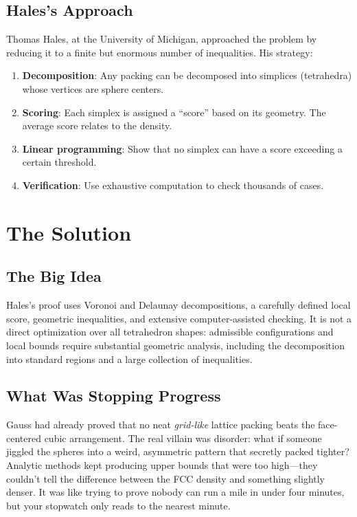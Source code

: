 \subsection{Hales's Approach}

Thomas Hales, at the University of Michigan, approached the problem by reducing it to a finite but enormous number of inequalities. His strategy:

\begin{enumerate}
\item \textbf{Decomposition}: Any packing can be decomposed into simplices (tetrahedra) whose vertices are sphere centers.
\item \textbf{Scoring}: Each simplex is assigned a ``score'' based on its geometry. The average score relates to the density.
\item \textbf{Linear programming}: Show that no simplex can have a score exceeding a certain threshold.
\item \textbf{Verification}: Use exhaustive computation to check thousands of cases.
\end{enumerate}

\section{The Solution}

\subsection{The Big Idea}
Hales's proof uses Voronoi and Delaunay decompositions, a carefully defined local score, geometric inequalities, and extensive computer-assisted checking. It is not a direct optimization over all tetrahedron shapes: admissible configurations and local bounds require substantial geometric analysis, including the decomposition into standard regions and a large collection of inequalities.

\subsection{What Was Stopping Progress}
Gauss had already proved that no neat \emph{grid-like} lattice packing beats the face-centered cubic arrangement. The real villain was disorder: what if someone jiggled the spheres into a weird, asymmetric pattern that secretly packed tighter? Analytic methods kept producing upper bounds that were too high---they couldn't tell the difference between the FCC density and something slightly denser. It was like trying to prove nobody can run a mile in under four minutes, but your stopwatch only reads to the nearest minute.

